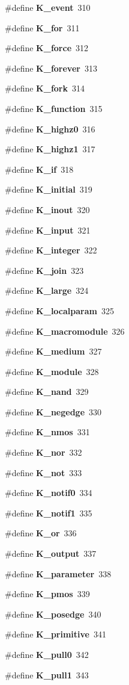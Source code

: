 \begin{CompactItemize}
\#define {\bf K\_\-event}\ 310
\item 
\#define {\bf K\_\-for}\ 311
\item 
\#define {\bf K\_\-force}\ 312
\item 
\#define {\bf K\_\-forever}\ 313
\item 
\#define {\bf K\_\-fork}\ 314
\item 
\#define {\bf K\_\-function}\ 315
\item 
\#define {\bf K\_\-highz0}\ 316
\item 
\#define {\bf K\_\-highz1}\ 317
\item 
\#define {\bf K\_\-if}\ 318
\item 
\#define {\bf K\_\-initial}\ 319
\item 
\#define {\bf K\_\-inout}\ 320
\item 
\#define {\bf K\_\-input}\ 321
\item 
\#define {\bf K\_\-integer}\ 322
\item 
\#define {\bf K\_\-join}\ 323
\item 
\#define {\bf K\_\-large}\ 324
\item 
\#define {\bf K\_\-localparam}\ 325
\item 
\#define {\bf K\_\-macromodule}\ 326
\item 
\#define {\bf K\_\-medium}\ 327
\item 
\#define {\bf K\_\-module}\ 328
\item 
\#define {\bf K\_\-nand}\ 329
\item 
\#define {\bf K\_\-negedge}\ 330
\item 
\#define {\bf K\_\-nmos}\ 331
\item 
\#define {\bf K\_\-nor}\ 332
\item 
\#define {\bf K\_\-not}\ 333
\item 
\#define {\bf K\_\-notif0}\ 334
\item 
\#define {\bf K\_\-notif1}\ 335
\item 
\#define {\bf K\_\-or}\ 336
\item 
\#define {\bf K\_\-output}\ 337
\item 
\#define {\bf K\_\-parameter}\ 338
\item 
\#define {\bf K\_\-pmos}\ 339
\item 
\#define {\bf K\_\-posedge}\ 340
\item 
\#define {\bf K\_\-primitive}\ 341
\item 
\#define {\bf K\_\-pull0}\ 342
\item 
\#define {\bf K\_\-pull1}\ 343

\end{CompactItemize}
